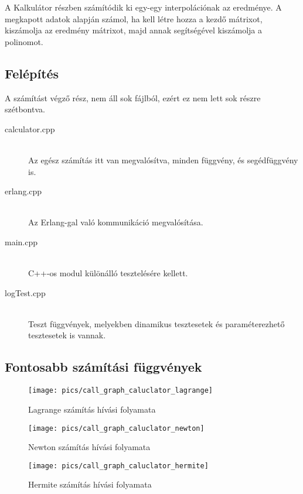 A Kalkulátor részben számítódik ki egy-egy interpolációnak az eredménye.
A megkapott adatok alapján számol, ha kell létre hozza a kezdő mátrixot, kiszámolja az eredmény mátrixot, majd annak segítségével kiszámolja a polinomot. \newline

\subsection{Felépítés}
	A számítást végző rész, nem áll sok fájlból, ezért ez nem lett sok részre szétbontva. 
	\begin{description}
		\item[calculator.cpp] 
		\hfill \\ Az egész számítás itt van megvalósítva, minden függvény, és segédfüggvény is.
		\item[erlang.cpp] 
		\hfill \\ Az Erlang-gal való kommunikáció megvalósítása.
		\item[main.cpp] 
		\hfill \\ C++-os modul különálló tesztelésére kellett.
		\item[logTest.cpp] 
		\hfill \\ 
		Teszt függvények, melyekben dinamikus tesztesetek és paraméterezhető tesztesetek is vannak.
	\end{description}
\subsection{Fontosabb számítási függvények}
	\begin{figure}[h]
		\texttt{[image: pics/call\_graph\_caluclator\_lagrange]}
		\centering
		\caption{Lagrange számítás hívási folyamata\label{fig:call_graph_caluclator_lagrange}}
	\end{figure}

	\begin{figure}[h]
		\texttt{[image: pics/call\_graph\_caluclator\_newton]}
		\centering
		\caption{Newton számítás hívási folyamata\label{fig:call_graph_caluclator_newton}}
	\end{figure}

	\begin{figure}[h]
		\texttt{[image: pics/call\_graph\_caluclator\_hermite]}
		\centering
		\caption{Hermite számítás hívási folyamata\label{fig:call_graph_caluclator_hermite}}
	\end{figure}

